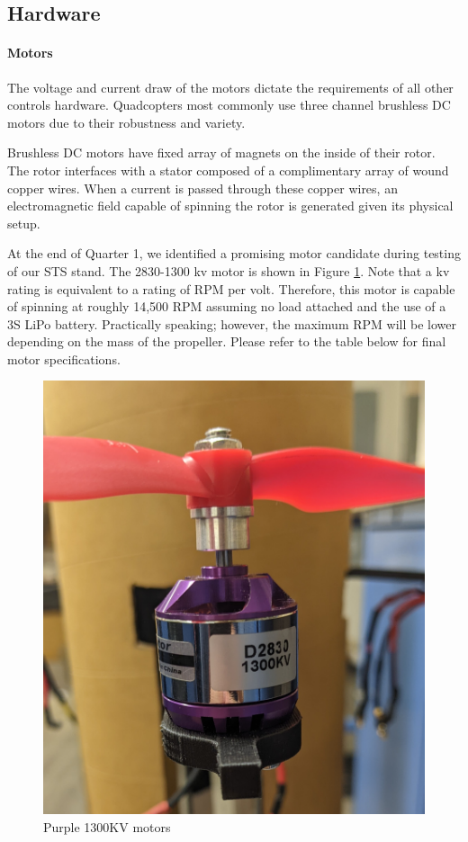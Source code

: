 \subsection{Hardware}
\label{design:controls:hardware}

\paragraph{Motors}

The voltage and current draw of the motors dictate the requirements of all other controls hardware. Quadcopters most commonly use three channel brushless DC motors due to their robustness and variety.

Brushless DC motors have fixed array of magnets on the inside of their rotor. The rotor interfaces with a stator composed of a complimentary array of wound copper wires. When a current is passed through these copper wires, an electromagnetic field capable of spinning the rotor is generated given its physical setup.

At the end of Quarter 1, we identified a promising motor candidate during testing of our STS stand. The 2830-1300 kv motor is shown in Figure \ref{fig:purple}. Note that a kv rating is equivalent to a rating of RPM per volt. Therefore, this motor is capable of spinning at roughly 14,500 RPM assuming no load attached and the use of a 3S LiPo battery. Practically speaking; however, the maximum RPM will be lower depending on the mass of the propeller. Please refer to the table below for final motor specifications.

\begin{figure}
    \centering
    \includegraphics[scale = 0.1]{src/figs/PurpleMotors.jpg}
    \caption{Purple 1300KV motors}
    \label{fig:purple}
\end{figure}


